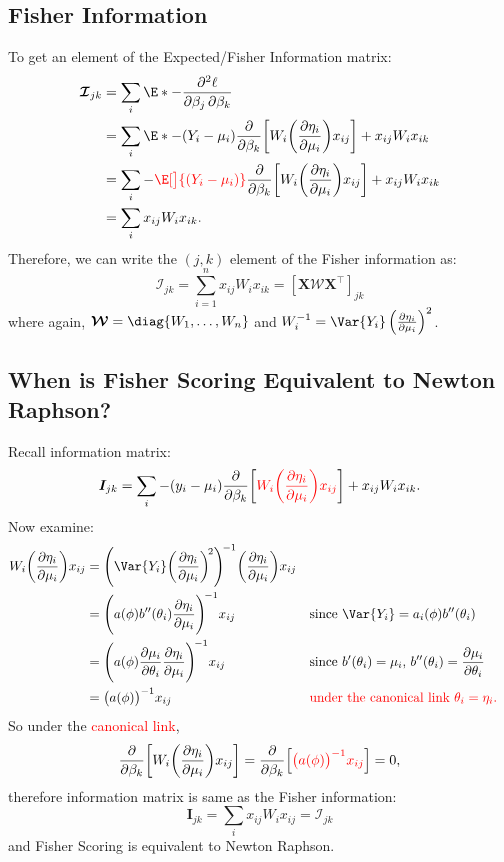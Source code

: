 \documentclass{article}\usepackage[]{graphicx}\usepackage[svgnames]{xcolor}
\providecommand{\Matrix}[1]{\bm{#1}}
\providecommand{\MatrixCal}[1]{\bm{\mathcal{#1}}}
\begin{document}
\subsection*{Fisher Information}
To get an element of the Expected/Fisher Information matrix:
\begin{align*}
    \MatrixCal{I}_{jk}
     & =\sum_i\E*{-\pdv{\ell}{\beta_j,\beta_k}}                                                                                                \\
     & =\sum_i\E*{-(Y_i-\mu_i)\pdv*{\biggl[W_i\biggl(\pdv{\eta_i}{\mu_i}\biggr)x_{ij}\biggr]}{\beta_k}+x_{ij}W_i x_{ik}}                       \\
     & =\sum_i-\textcolor{Red}{\E[\big]{(Y_i-\mu_i)}}\pdv*{\biggl[W_i\biggl(\pdv{\eta_i}{\mu_i}\biggr)x_{ij}\biggr]}{\beta_k}+x_{ij}W_i x_{ik} \\
     & =\sum_i x_{ij}W_i x_{ik}.
\end{align*}
Therefore, we can write the $(j, k)$ element of the Fisher information as:
\[ \MatrixCal{I}_{jk}=\sum_{i=1}^{n} x_{ij}W_i x_{ik}=[\Matrix{X}\Matrix{\MatrixCal{W}}\Matrix{X}^\top]_{jk} \]
where again, $ \MatrixCal{W}=\diag{W_1,\ldots,W_n} $ and $ W_i^{-1}=\Var{Y_i}\pdv{\eta_i}{\mu_i}^2 $.
\subsection*{When is Fisher Scoring Equivalent to Newton Raphson?}
Recall information matrix:
\[  \Matrix{I}_{jk}=\sum_i -(y_i-\mu_i)\pdv*{\biggl[\textcolor{Red}{W_i\biggl(\pdv{\eta_i}{\mu_i}\biggr)x_{ij}}\biggr]}{\beta_k}+x_{ij}W_i x_{ik}. \]
Now examine:
\begin{align*}
    W_i\biggl(\pdv{\eta_i}{\mu_i}\biggr)x_{ij}
     & =\Biggl(\Var{Y_i}\biggl(\pdv{\eta_i}{\mu_i}\biggr)^{\!2}\Biggr)^{\!-1}\biggl(\pdv{\eta_i}{\mu_i}\biggr)x_{ij}                                                                                                        \\
     & =\Biggl(a(\phi)b^{\prime\prime}(\theta_i)\pdv{\eta_i}{\mu_i}\Biggr)^{\!-1}x_{ij}                              &  & \text{since $\Var{Y_i}=a_i(\phi)b^{\prime\prime}(\theta_i)$}                                      \\
     & =\Biggl(a(\phi)\pdv{\mu_i}{\theta_i}\pdv{\eta_i}{\mu_i} \Biggr)^{\!-1}x_{ij}                                  &  & \text{since $ b^{\prime}(\theta_i)=\mu_i $, $ b^{\prime\prime}(\theta_i)=\pdv{\mu_i}{\theta_i} $} \\
     & =\bigl(a(\phi)\bigr)^{-1}x_{ij}                                                                               &  & \text{\textcolor{Red}{under the canonical link $\theta_i=\eta_i$.}}
\end{align*}
So under the \textcolor{Red}{canonical link},
\[ \pdv*{\biggl[W_i\biggl(\pdv{\eta_i}{\mu_i}\biggr)x_{ij}\biggr]}{\beta_k}=\pdv*{\Bigl[\textcolor{Red}{\bigl(a(\phi)\bigr)^{-1}x_{ij}}\Bigr]}{\beta_k}=0, \]
therefore information matrix is same as the Fisher information:
\[ \Matrix{I}_{jk}=\sum_{i}x_{ij}W_i x_{ij}=\MatrixCal{I}_{jk}  \]
and Fisher Scoring is equivalent to Newton Raphson.
\end{document}
